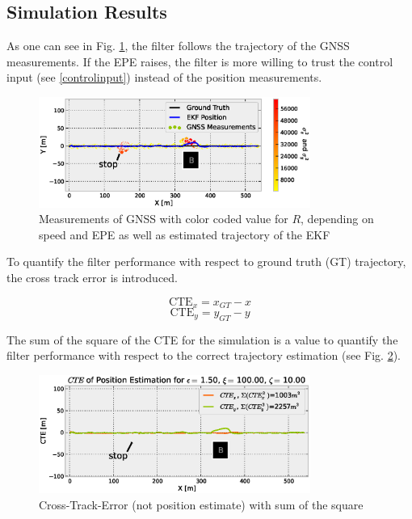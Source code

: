 \documentclass[conference]{IEEEtran}
\begin{document}
\subsection{Simulation Results}

As one can see in Fig. \ref{CTRV-Position-Testdata}, the filter follows the trajectory of the GNSS measurements. If the EPE raises, the filter is more willing to trust the control input (see \eqref{controlinput}) instead of the position measurements.

\begin{figure}[ht]
\centering
\includegraphics[width=3.5in]{images/Extended-Kalman-Filter-CTRV-Position-Testdata}
\caption{Measurements of GNSS with color coded value for $R$, depending on speed and EPE as well as estimated trajectory of the EKF}
\label{CTRV-Position-Testdata}
\end{figure}

To quantify the filter performance with respect to ground truth (GT) trajectory, the cross track error is introduced.

\begin{equation}\text{CTE}_x=x_{GT}-x\end{equation}
\begin{equation}\text{CTE}_y=y_{GT}-y\end{equation}

The sum of the square of the CTE for the simulation is a value to quantify the filter performance with respect to the correct trajectory estimation (see Fig. \ref{CTRV-CTE-Testdata}).

\begin{figure}[ht]
\centering
\includegraphics[width=3.5in]{images/Extended-Kalman-Filter-CTRV-CTE-Testdata}
\caption{Cross-Track-Error (not position estimate) with sum of the square}
\label{CTRV-CTE-Testdata}
\end{figure}
\end{document}
